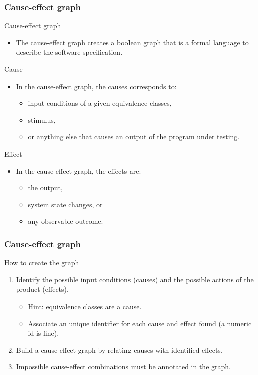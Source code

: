 \begin{frame}[hasprev=true, hasnext=true]
\frametitle{Cause-effect graph}

\begin{block:fact}{Cause-effect graph}
\begin{itemize}
	\item The cause-effect graph creates a boolean graph that is a formal
	language to describe the software specification.
\end{itemize}
\end{block:fact}


\begin{block:fact}{Cause}
\begin{itemize}
	\item In the cause-effect graph, the causes corresponds to:
	\begin{itemize}
		\item input conditions of a given equivalence classes,
		\item stimulus,
		\item or anything else that causes an output of the program under
		testing.
	\end{itemize}
\end{itemize}
\end{block:fact}


\begin{block:fact}{Effect}
\begin{itemize}
	\item In the cause-effect graph, the effects are:
	\begin{itemize}
		\item the output,
		\item system state changes, or
		\item any observable outcome.
	\end{itemize}
\end{itemize}
\end{block:fact}
\end{frame}


\begin{frame}
\frametitle{Cause-effect graph}

\begin{block:procedure}{How to create the graph}
\begin{enumerate}
	\item Identify the possible input conditions (causes) and the possible
	actions of the product (effects).
	\begin{itemize}
		\item Hint: equivalence classes are a cause.
		\item Associate an unique identifier for each cause and effect found
		(a numeric id is fine).
	\end{itemize}

	\item Build a cause-effect graph by relating causes with identified
	effects.

    \item Impossible cause-effect combinations must be annotated in the graph.
\end{enumerate}
\end{block:procedure}
\end{frame}


